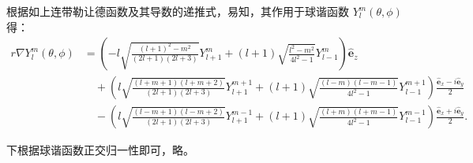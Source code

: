 \documentclass{article}
\begin{document}
	根据如上连带勒让德函数及其导数的递推式，易知，其作用于球谐函数 $Y_l^m(\theta,\phi)$ 得：
	\begin{align*}
		r\nabla Y_l^m(\theta,\phi)&=\left(-l\sqrt{\frac{(l+1)^2-m^2}{(2l+1)(2l+3)}}Y_{l+1}^m+(l+1)\sqrt{\frac{l^2-m^2}{4l^2-1}}Y_{l-1}^m\right)\hat{\bm{e}}_z\\[6pt]
		&\quad+\left(l\sqrt{\frac{(l+m+1)(l+m+2)}{(2l+1)(2l+3)}}Y_{l+1}^{m+1}+(l+1)\sqrt{\frac{(l-m)(l-m-1)}{4l^2-1}}Y_{l-1}^{m+1}\right)\frac{\hat{\bm{e}}_x - i\hat{\bm{e}}_y}{2}\\[6pt]
		&\quad-\left(l\sqrt{\frac{(l-m+1)(l-m+2)}{(2l+1)(2l+3)}}Y_{l+1}^{m-1}+(l+1)\sqrt{\frac{(l+m)(l+m-1)}{4l^2-1}}Y_{l-1}^{m-1}\right)\frac{\hat{\bm{e}}_x + i\hat{\bm{e}}_y}{2}.
	\end{align*}
	
	下根据球谐函数正交归一性即可，略。
\end{document}
